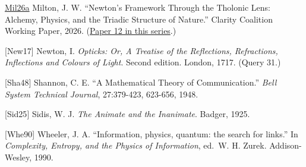 \documentclass[
  11pt,
  letterpaper,
]{article}
\begin{document}
\href{https://github.com/baardev/truevalue/blob/main/docnav/Research/papers/12_newton-tholonic-framework/12_newton-tholonic-framework.pdf}{Mil26a}
Milton, J. W. ``Newton's Framework Through the Tholonic Lens: Alchemy,
Physics, and the Triadic Structure of Nature.'' Clarity Coalition
Working Paper, 2026.
(\href{https://github.com/baardev/truevalue/blob/main/docnav/Research/papers/12_newton-tholonic-framework/12_newton-tholonic-framework.pdf}{Paper
12 in this series}.)

{[}New17{]} Newton, I. \emph{Opticks: Or, A Treatise of the Reflections,
Refractions, Inflections and Colours of Light}. Second edition. London,
1717. (Query 31.)

{[}Sha48{]} Shannon, C. E. ``A Mathematical Theory of Communication.''
\emph{Bell System Technical Journal}, 27:379-423, 623-656, 1948.

{[}Sid25{]} Sidis, W. J. \emph{The Animate and the Inanimate}. Badger,
1925.

{[}Whe90{]} Wheeler, J. A. ``Information, physics, quantum: the search
for links.'' In \emph{Complexity, Entropy, and the Physics of
Information}, ed.~W. H. Zurek. Addison-Wesley, 1990.
\end{document}
